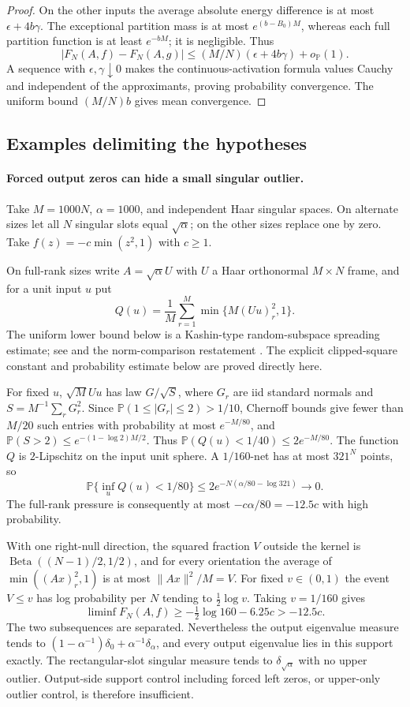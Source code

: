 \documentclass[11pt]{article}
\numberwithin{equation}{section}
\theoremstyle{definition}
\newcommand{\Pbb}{\mathbb P}
\newcommand{\norm}[1]{\lVert #1\rVert}
\begin{document}
\begin{proof}
On the other inputs the average absolute energy difference is at most $\epsilon+4b\gamma$. The exceptional partition mass is at most $e^{(b-B_0)M}$, whereas each full partition function is at least $e^{-bM}$; it is negligible. Thus
\[
|F_N(A,f)-F_N(A,g)|\le(M/N)(\epsilon+4b\gamma)+o_{\Pbb}(1).
\]
A sequence with $\epsilon,\gamma\downarrow0$ makes the continuous-activation formula values Cauchy and independent of the approximants, proving probability convergence. The uniform bound $(M/N)b$ gives mean convergence.
\end{proof}

\subsection{Examples delimiting the hypotheses}
\paragraph{Forced output zeros can hide a small singular outlier.}
Take $M=1000N$, $\alpha=1000$, and independent Haar singular spaces. On alternate sizes let all $N$ singular slots equal $\sqrt\alpha$; on the other sizes replace one by zero. Take $f(z)=-c\min(z^2,1)$ with $c\ge1$.

On full-rank sizes write $A=\sqrt\alpha U$ with $U$ a Haar orthonormal $M\times N$ frame, and for a unit input $u$ put
\[
Q(u)=\frac1M\sum_{r=1}^M\min\{M(Uu)_r^2,1\}.
\]
The uniform lower bound below is a Kashin-type random-subspace
spreading estimate; see \cite{Kashin1977} and the norm-comparison restatement
\cite[Theorem~F.1]{BayatiMontanariLasso}.  The explicit clipped-square
constant and probability estimate below are proved directly here.

For fixed $u$, $\sqrt M Uu$ has law $G/\sqrt S$, where $G_r$ are iid standard normals and $S=M^{-1}\sum_rG_r^2$. Since $\Pbb(1\le|G_r|\le2)>1/10$, Chernoff bounds give fewer than $M/20$ such entries with probability at most $e^{-M/80}$, and $\Pbb(S>2)\le e^{-(1-\log2)M/2}$. Thus $\Pbb(Q(u)<1/40)\le2e^{-M/80}$. The function $Q$ is $2$-Lipschitz on the input unit sphere. A $1/160$-net has at most $321^N$ points, so
\[
\Pbb\{\inf_uQ(u)<1/80\}\le2e^{-N(\alpha/80-\log321)}\longrightarrow0.
\]
The full-rank pressure is consequently at most $-c\alpha/80=-12.5c$ with high probability.

With one right-null direction, the squared fraction $V$ outside the kernel is $\operatorname{Beta}((N-1)/2,1/2)$, and for every orientation the average of $\min((Ax)_r^2,1)$ is at most $\norm{Ax}^2/M=V$. For fixed $v\in(0,1)$ the event $V\le v$ has log probability per $N$ tending to $\frac12\log v$. Taking $v=1/160$ gives
\[
\liminf F_N(A,f)\ge-\tfrac12\log160-6.25c>-12.5c.
\]
The two subsequences are separated. Nevertheless the output eigenvalue measure tends to $(1-\alpha^{-1})\delta_0+\alpha^{-1}\delta_\alpha$, and every output eigenvalue lies in this support exactly. The rectangular-slot singular measure tends to $\delta_{\sqrt\alpha}$ with no upper outlier. Output-side support control including forced left zeros, or upper-only outlier control, is therefore insufficient.
\end{document}
